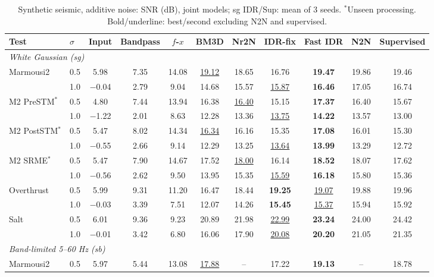 \begin{table}[!t]
\centering
\caption{Synthetic seismic, additive noise: SNR (dB), joint models; sg IDR/Sup: mean of 3 seeds. $^\ast$Unseen processing. Bold/underline: best/second excluding N2N and supervised.}
\label{tab:seis_add}
\begin{tabular}{llccccccccc}
\toprule
Test & $\sigma$ & Input & Bandpass & $f$-$x$ & BM3D & Nr2N & IDR-fix & Fast IDR & N2N & Supervised \\
\midrule
\multicolumn{11}{l}{\emph{White Gaussian (sg)}} \\
Marmousi2 & 0.5 & 5.98 & 7.35 & 14.08 & \underline{19.12} & 18.65 & 16.76 & \textbf{19.47} & 19.86 & 19.46 \\
 & 1.0 & $-$0.04 & 2.79 & 9.04 & 14.68 & 15.57 & \underline{15.87} & \textbf{16.46} & 17.05 & 16.74 \\
M2 PreSTM$^\ast$ & 0.5 & 4.80 & 7.44 & 13.94 & 16.38 & \underline{16.40} & 15.15 & \textbf{17.37} & 16.40 & 15.67 \\
 & 1.0 & $-$1.22 & 2.01 & 8.63 & 12.28 & 13.36 & \underline{13.75} & \textbf{14.22} & 13.57 & 13.00 \\
M2 PostSTM$^\ast$ & 0.5 & 5.47 & 8.02 & 14.34 & \underline{16.34} & 16.16 & 15.35 & \textbf{17.08} & 16.01 & 15.30 \\
 & 1.0 & $-$0.55 & 2.66 & 9.14 & 12.29 & 13.25 & \underline{13.64} & \textbf{13.99} & 13.29 & 12.72 \\
M2 SRME$^\ast$ & 0.5 & 5.47 & 7.90 & 14.67 & 17.52 & \underline{18.00} & 16.14 & \textbf{18.52} & 18.07 & 17.62 \\
 & 1.0 & $-$0.56 & 2.62 & 9.50 & 13.95 & 15.35 & \underline{15.59} & \textbf{16.18} & 15.80 & 15.36 \\
Overthrust & 0.5 & 5.99 & 9.31 & 11.20 & 16.47 & 18.44 & \textbf{19.25} & \underline{19.07} & 19.88 & 19.96 \\
 & 1.0 & $-$0.03 & 3.39 & 7.51 & 12.07 & 14.26 & \textbf{15.45} & \underline{15.37} & 15.94 & 15.92 \\
Salt & 0.5 & 6.01 & 9.36 & 9.23 & 20.89 & 21.98 & \underline{22.99} & \textbf{23.24} & 24.00 & 24.42 \\
 & 1.0 & $-$0.01 & 3.42 & 6.80 & 16.06 & 17.90 & \underline{20.08} & \textbf{20.20} & 21.05 & 21.35 \\
\midrule
\multicolumn{11}{l}{\emph{Band-limited 5--60 Hz (sb)}} \\
Marmousi2 & 0.5 & 5.97 & 5.44 & 13.08 & \underline{17.88} & -- & 17.22 & \textbf{19.13} & -- & 18.78 \\

\end{tabular}
\end{table}
